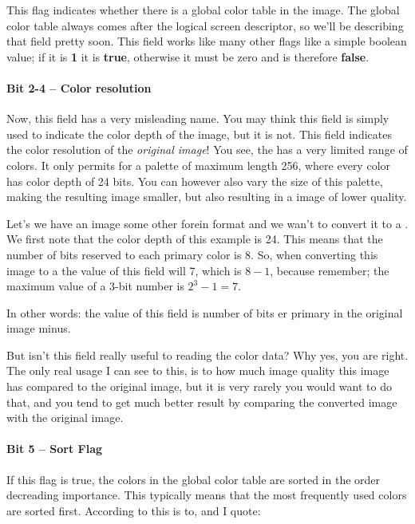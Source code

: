\begin{refsection}
  This flag indicates whether there is a global color table in the
  image. The global color table always comes after the logical screen
  descriptor, so we'll be describing that field pretty soon. This
  field works like many other flags like a simple boolean value; if it
  is \textbf{1} it is \textbf{true}, otherwise it must be zero and is
  therefore \textbf{false}.

  \paragraph{Bit 2-4 -- Color resolution}

  Now, this field has a very misleading name. You may think this field
  is simply used to indicate the color depth of the image, but it is
  not. This field indicates the color resolution of the
  \textit{original image}! You see, the \gif has a very limited range
  of colors. It only permits for a palette of maximum length 256,
  where every color has color depth of 24 bits. You can however also
  vary the size of this palette, making the resulting image smaller,
  but also resulting in a image of lower quality.

  Let's we have an image some other forein format and we wan't to
  convert it to a \gif. We first note that the color depth of this
  example is 24. This means that the number of bits reserved to each
  primary color is 8. So, when converting this image to a \gif the
  value of this field will 7, which is $8-1$, because remember; the
  maximum value of a 3-bit number is $2^3 - 1 = 7$.

  In other words: the value of this field is number of bits er primary
  in the original image minus.

  But isn't this field really useful to reading the color data? Why
  yes, you are right. The only real usage I can see to this, is to how
  much image quality this image has compared to the original image,
  but it is very rarely you would want to do that, and you tend to get
  much better result by comparing the converted \gif image with the
  original image.

  \paragraph{Bit 5 -- Sort Flag}

  If this flag is true, the colors in the global color table are
  sorted in the order decreading importance. This typically means that
  the most frequently used colors are sorted first. According to
  \cite{gif89a} this is to, and I quote:


\end{refsection}
